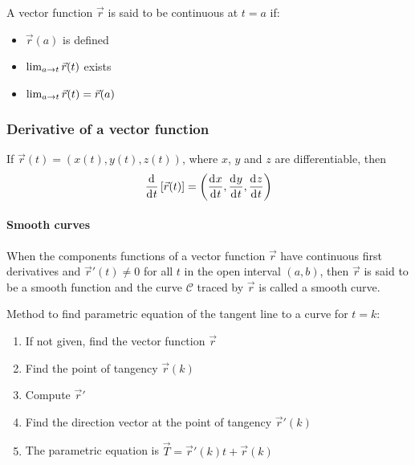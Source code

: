 \documentclass[10pt, twocolumn]{article}
\theoremstyle{remark}
\begin{document}
A vector function \(\vec{r}\) is said to be continuous at \(t = a\) if:
\begin{itemize}
  \item \(\vec{r}(a)\) is defined
  \item \(\lim_{a \to t}{\vec{r}(t)}\) exists
  \item \(\lim_{a \to t}{\vec{r}(t)} = \vec{r}(a)\)
\end{itemize}

\subsubsection*{Derivative of a vector function}
If \(\vec{r}(t) = \left( x(t), y(t), z(t) \right)\), where \(x\), \(y\) and \(z\) are differentiable, then
\[
  \frac{\mathrm{d}^{}}{\mathrm{d}^{} t}\left[ \vec{r}(t) \right] = \left( \frac{\mathrm{d}^{} x}{\mathrm{d}^{} t}, \frac{\mathrm{d}^{} y}{\mathrm{d}^{} t}, \frac{\mathrm{d}^{} z}{\mathrm{d}^{} t} \right)
\]

\paragraph*{Smooth curves}
When the components functions of a vector function \(\vec{r}\) have continuous first derivatives and \(\vec{r}'(t) \neq 0\) for all \(t\) in the open interval \((a, b)\), then \(\vec{r}\) is said to be a smooth function and the curve \(\mathscr{C}\) traced by \(\vec{r}\) is called a smooth curve.

Method to find parametric equation of the tangent line to a curve for \(t = k\):
\begin{enumerate}
  \item If not given, find the vector function \(\vec{r}\)
  \item Find the point of tangency \(\vec{r}(k)\)
  \item Compute \(\vec{r}'\)
  \item Find the direction vector at the point of tangency \(\vec{r}'(k)\)
  \item The parametric equation is \(\vec{T} = \vec{r}'(k)t + \vec{r}(k)\)
\end{enumerate}
\end{document}
